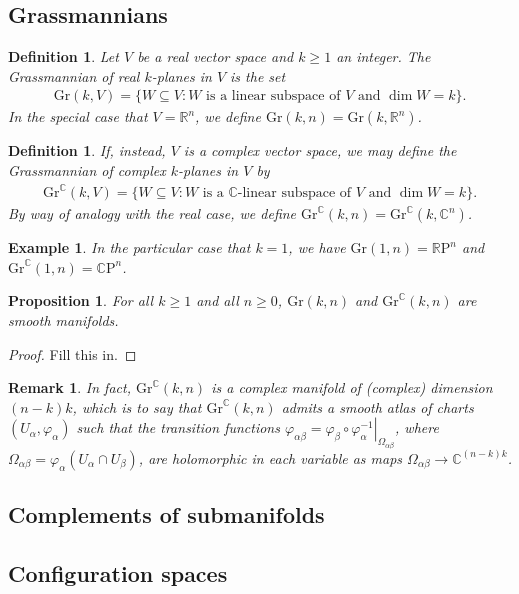 \documentclass{amsart}          %
\newtheorem{proposition}[theorem]{Proposition}
\newtheorem{definition}[theorem]{Definition}
\newtheorem{remark}[theorem]{Remark}
\newtheorem{example}[theorem]{Example}
\newcommand{\R}{\mathbb R}
\newcommand{\C}{\mathbb C}
\newcommand{\RP}{\mathbb{R}\mathrm{P}}
\newcommand{\CP}{\mathbb{C}\mathrm{P}}
\newcommand{\Gr}{\mathrm{Gr}}
\begin{document}
\subsection{Grassmannians}
\begin{definition}
	Let $V$ be a real vector space and $k\geq 1$ an integer. The \textit{Grassmannian of real $k$-planes in $V$} is the set\begin{align*}
	\Gr(k,V)=\{W\subseteq V:\text{$W$ is a linear subspace of $V$ and $\dim W=k$}\}.
	\end{align*}
	In the special case that $V=\R^n$, we define $\Gr(k,n)=\Gr(k,\R^n)$.
\end{definition}
\begin{definition}
	If, instead, $V$ is a \textit{complex} vector space, we may define the \textit{Grassmannian of complex $k$-planes in $V$} by\begin{align*}
	\Gr^\C(k,V)=\{W\subseteq V:\text{$W$ is a $\C$-linear subspace of $V$ and $\dim W=k$}\}.
	\end{align*}
	By way of analogy with the real case, we define $\Gr^\C(k,n)=\Gr^\C(k,\C^n)$.
\end{definition}
\begin{example}
	In the particular case that $k=1$, we have $\Gr(1,n)=\RP^n$ and $\Gr^\C(1,n)=\CP^n$.
\end{example}
\begin{proposition}
	For all $k\geq 1$ and all $n\geq 0$, $\Gr(k,n)$ and $\Gr^\C(k,n)$ are smooth manifolds.
\end{proposition}
\begin{proof}
	Fill this in.
\end{proof}
\begin{remark}
	In fact, $\Gr^\C(k,n)$ is a complex manifold of (complex) dimension $(n-k)k$, which is to say that $\Gr^\C(k,n)$ admits a smooth atlas of charts $(U_\alpha,\varphi_\alpha)$ such that the transition functions $\varphi_{\alpha\beta}=\left.\varphi_\beta\circ\varphi_{\alpha}^{-1}\right|_{\Omega_{\alpha\beta}}$, where $\Omega_{\alpha\beta}=\varphi_\alpha(U_\alpha\cap U_\beta)$, are holomorphic in each variable as maps $\Omega_{\alpha\beta}\to\C^{(n-k)k}$.
\end{remark}

\subsection{Complements of submanifolds}

\subsection{Configuration spaces}
\end{document}
